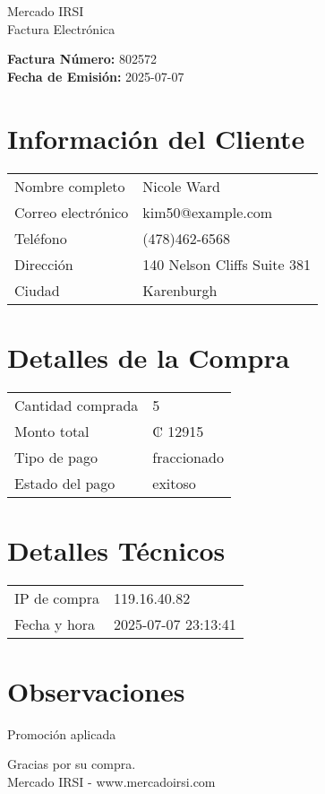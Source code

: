 \documentclass[12pt]{article}
\begin{document}
\begin{center}
    \Huge Mercado IRSI \\
    \Large Factura Electrónica
\end{center}

\vspace{0.5cm}

\noindent \textbf{Factura Número:} 802572 \\
\textbf{Fecha de Emisión:} 2025-07-07

\vspace{0.5cm}

\section*{Información del Cliente}
\begin{longtable}{ll}
Nombre completo & Nicole Ward \\
Correo electrónico & kim50@example.com \\
Teléfono & (478)462-6568 \\
Dirección & 140 Nelson Cliffs Suite 381 \\
Ciudad & Karenburgh \\
\end{longtable}

\vspace{0.5cm}

\section*{Detalles de la Compra}
\begin{longtable}{ll}
Cantidad comprada & 5 \\
Monto total & ₡ 12915 \\
Tipo de pago & fraccionado \\
Estado del pago & exitoso \\
\end{longtable}

\vspace{0.5cm}

\section*{Detalles Técnicos}
\begin{longtable}{ll}
IP de compra & 119.16.40.82 \\
Fecha y hora & 2025-07-07 23:13:41 \\
\end{longtable}

\vspace{0.5cm}

\section*{Observaciones}
Promoción aplicada

\vspace{0.5cm}

\begin{center}
    Gracias por su compra. \\
    Mercado IRSI - www.mercadoirsi.com
\end{center}
\end{document}
